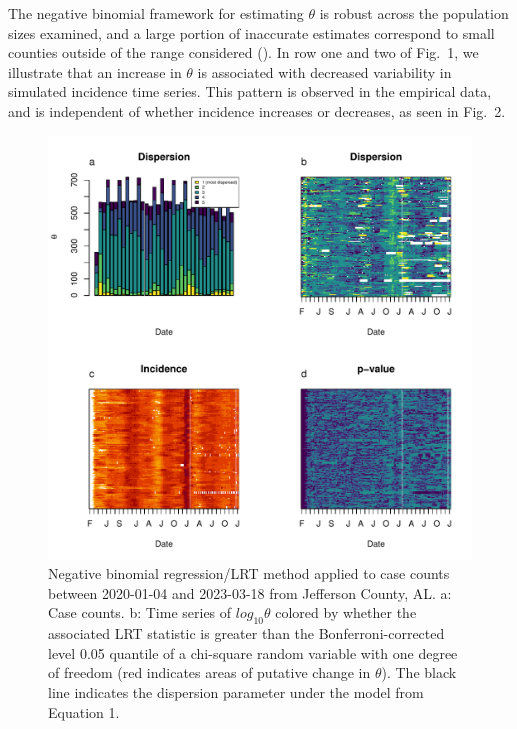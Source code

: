 \documentclass[10pt,letterpaper]{article}
\begin{document}
The negative binomial framework for estimating \begin{math}\theta\end{math} is robust across the population sizes examined, and a large portion of inaccurate estimates correspond to small counties outside of the range considered ().
In row one and two of Fig.\ 1, we illustrate that an increase in \begin{math}\theta\end{math} is associated with decreased variability in simulated incidence time series. This pattern is observed in the empirical data, and is independent of whether incidence increases or decreases, as seen in Fig.\ 2.

\begin{figure}[!h]
\includegraphics[width=1\textwidth]{fig2.pdf}
\caption{Negative binomial regression/LRT method applied to case counts between 2020-01-04 and 2023-03-18 from Jefferson County, AL. a: Case counts. b: Time series of $log_{10}\theta$ colored by whether the associated LRT statistic is greater than the Bonferroni-corrected level 0.05 quantile of a chi-square random variable with one degree of freedom (red indicates areas of putative change in $\theta$). The black line indicates the dispersion parameter under the model from Equation 1.
}
\label{fig2}
\end{figure}
\end{document}
